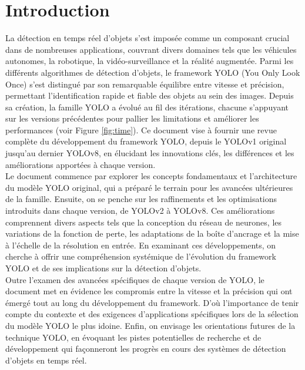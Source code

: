 \documentclass{article}
\begin{document}
\section{Introduction}

La détection en temps réel d'objets s'est imposée comme un composant crucial dans de nombreuses applications, couvrant divers domaines tels que les véhicules autonomes, la robotique, la vidéo-surveillance et la réalité augmentée. Parmi les différents algorithmes de détection d'objets, le framework YOLO (You Only Look Once) s'est distingué par son remarquable équilibre entre vitesse et précision, permettant l'identification rapide et fiable des objets au sein des images. Depuis sa création, la famille YOLO a évolué au fil des itérations, chacune s'appuyant sur les versions précédentes pour pallier les limitations et améliorer les performances (voir Figure \ref{fig:time}). Ce document vise à fournir une revue complète du développement du framework YOLO, depuis le YOLOv1 original jusqu'au dernier YOLOv8, en élucidant les innovations clés, les différences et les améliorations apportées à chaque version.
\vspace{0.2cm}\\
Le document commence par explorer les concepts fondamentaux et l'architecture du modèle YOLO original, qui a préparé le terrain pour les avancées ultérieures de la famille. Ensuite, on se penche sur les raffinements et les optimisations introduits dans chaque version, de YOLOv2 à YOLOv8. Ces améliorations comprennent divers aspects tels que la conception du réseau de neurones, les variations de la fonction de perte, les adaptations de la boîte d'ancrage et la mise à l'échelle de la résolution en  entrée. En examinant ces développements, on cherche à offrir une compréhension systémique de l'évolution du framework YOLO et de ses implications sur la détection d'objets.
\vspace{0.2cm}\\
Outre l'examen des avancées spécifiques de chaque version de YOLO, le document met en évidence les compromis entre la vitesse et la précision qui ont émergé tout au long du développement du framework. D'où l'importance de tenir compte du contexte et des exigences d'applications spécifiques lors de la sélection du modèle YOLO le plus idoine. Enfin, on envisage les orientations futures de la technique YOLO, en évoquant les pistes potentielles de recherche et de développement qui façonneront les progrès en cours des systèmes de détection d'objets en temps réel.
\end{document}
